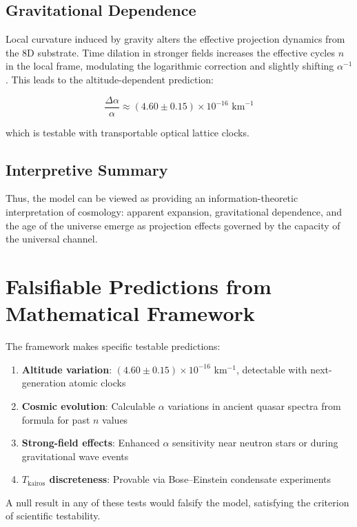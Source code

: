 \documentclass[pdflatex,sn-mathphys-num]{sn-jnl}
\theoremstyle{thmstyleone}
\theoremstyle{thmstyletwo}
\theoremstyle{thmstylethree}
\begin{document}
\subsection{Gravitational Dependence}\label{subsec:s1-gravity}
Local curvature induced by gravity alters the effective projection dynamics from the 8D substrate. Time dilation in stronger fields increases the effective cycles $n$ in the local frame, modulating the logarithmic correction and slightly shifting $\alpha^{-1}$. This leads to the altitude-dependent prediction:

\begin{equation}
\frac{\Delta \alpha}{\alpha} \approx (4.60 \pm 0.15) \times 10^{-16} \text{ km}^{-1}
\end{equation}

which is testable with transportable optical lattice clocks.

\subsection{Interpretive Summary}\label{subsec:s1-summary}
Thus, the model can be viewed as providing an information-theoretic interpretation of cosmology: apparent expansion, gravitational dependence, and the age of the universe emerge as projection effects governed by the capacity of the universal channel.

\section{Falsifiable Predictions from Mathematical Framework}\label{sec:s1-falsifiable}
The framework makes specific testable predictions:
\begin{enumerate}
    \item \textbf{Altitude variation}: $(4.60 \pm 0.15) \times 10^{-16}$ km$^{-1}$, detectable with next-generation atomic clocks
    \item \textbf{Cosmic evolution}: Calculable $\alpha$ variations in ancient quasar spectra from formula for past $n$ values
    \item \textbf{Strong-field effects}: Enhanced $\alpha$ sensitivity near neutron stars or during gravitational wave events
    \item \textbf{$T_{\text{kairos}}$ discreteness}: Provable via Bose--Einstein condensate experiments
\end{enumerate}

A null result in any of these tests would falsify the model, satisfying the criterion of scientific testability.
\end{document}
